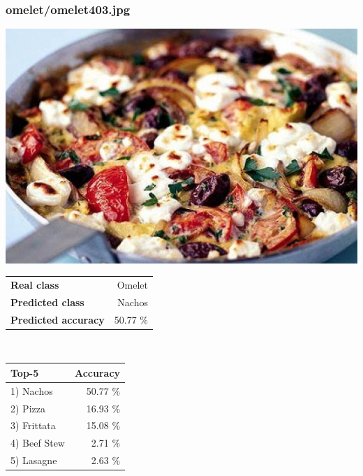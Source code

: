 \subsubsection{omelet/omelet403.jpg}

\begin{minipage}[t]{0.4\textwidth}
	\vspace{0pt}
	\includegraphics[width=\linewidth]{images/evaluation-images/omelet/omelet403.jpg}
\end{minipage}
\hfill
\begin{minipage}[t]{0.5\textwidth}
	\vspace{0pt}\raggedright
	\begin{tabularx}{\textwidth}{X r}
		\small \textbf{Real class} & \small Omelet\\
		\small \textbf{Predicted class} & \small Nachos\\
		\small \textbf{Predicted accuracy} & \small 50.77 \%
    \end{tabularx}\\
    
    \vspace{6pt}
	\begin{tabularx}{\textwidth}{X r}
        \small \textbf{Top-5} & \small \textbf{Accuracy} \\
        \hline
		\small 1) Nachos & \small 50.77 \%\\\small 2) Pizza & \small 16.93 \%\\\small 3) Frittata & \small 15.08 \%\\\small 4) Beef Stew & \small 2.71 \%\\\small 5) Lasagne & \small 2.63 \%
    \end{tabularx}
\end{minipage}
    

